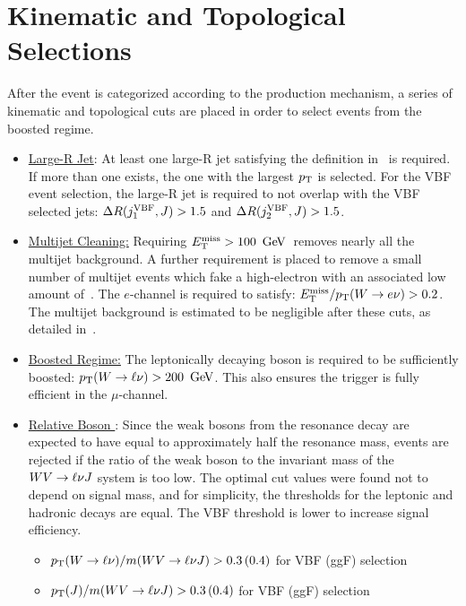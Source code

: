 \section{Kinematic and Topological Selections}
After the event is categorized according to the production mechanism, a series of kinematic and topological cuts are placed in order to select events from the boosted regime. 
\begin{itemize}
\item\underline{Large-R Jet}: At least one large-R jet satisfying the definition in~\Sect{\ref{ch:objectReconstruction:larger}} is required. If more than one exists, the one with the largest $p_{\text{T}}$ is selected. For the VBF event selection, the large-R jet is required to not overlap with the VBF selected jets: $\Delta R(j_1^{\rm VBF},J)>1.5$ and $\Delta R(j_2^{\rm VBF},J)>1.5$.
\item\underline{Multijet Cleaning:} Requiring $\MET>100\,\GeV$\, removes nearly all the multijet background. A further requirement is placed to remove a small number of multijet events which fake a high-\pT electron with an associated low amount of \MET. The $e$-channel is required to satisfy: $E_{\text{T}}^{\text{miss}}/p_{\text{T}}(W\rightarrow e\nu)>0.2$. The multijet background is estimated to be negligible after these cuts, as detailed in~\App{\ref{ch:qcd}}. 
\item\underline{Boosted Regime:} The leptonically decaying boson is required to be sufficiently boosted: $\pT(W\ra\ell\nu)>200\,\GeV$. This also ensures the \MET trigger is fully efficient in the $\mu$-channel.
\item\underline{Relative Boson \pT}: Since the weak bosons from the resonance decay are expected to have \pT equal to approximately half the resonance mass, events are rejected if the ratio of the weak boson \pT to the invariant mass of the $WV\rightarrow\ell\nu J$ system is too low. The optimal cut values were found not to depend on signal mass, and for simplicity, the thresholds for the leptonic and hadronic decays are equal. The VBF threshold is lower to increase signal efficiency. 
\begin{itemize}
\item $p_{\text{T}}(W\rightarrow\ell\nu)/m(WV\rightarrow\ell\nu J) > 0.3\, (0.4)$ for VBF (ggF) selection
\item $p_{\text{T}}(J)/m(WV\rightarrow\ell\nu J) > 0.3\, (0.4)$ for VBF (ggF) selection
\end{itemize}
\end{itemize}



%
